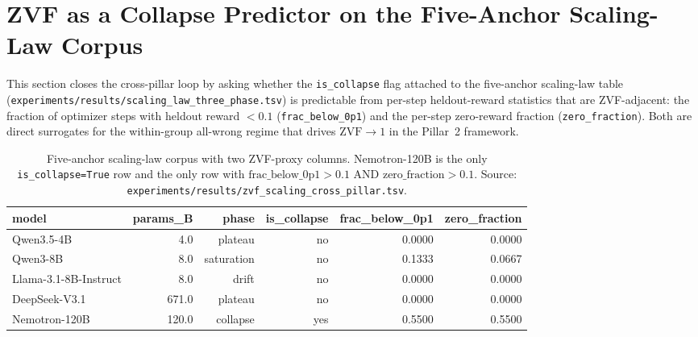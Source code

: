 %


\section{ZVF as a Collapse Predictor on the Five-Anchor Scaling-Law Corpus}
\label{sec:zvf-scaling}

This section closes the cross-pillar loop by asking whether the
\texttt{is\_collapse} flag attached to the five-anchor scaling-law
table (\texttt{experiments/results/scaling\_law\_three\_phase.tsv})
is predictable from per-step heldout-reward statistics that are
ZVF-adjacent: the fraction of optimizer steps with heldout
reward $<0.1$ (\texttt{frac\_below\_0p1}) and the per-step
zero-reward fraction (\texttt{zero\_fraction}). Both are direct
surrogates for the within-group all-wrong regime that drives
$\mathrm{ZVF} \to 1$ in the Pillar~2 framework.

\begin{table}[htbp]
\centering
\small
\begin{tabular}{lrrrrr}
\toprule
model & params\_B & phase & is\_collapse & frac\_below\_0p1 & zero\_fraction \\
\midrule
Qwen3.5-4B & 4.0 & plateau & no & 0.0000 & 0.0000 \\
Qwen3-8B & 8.0 & saturation & no & 0.1333 & 0.0667 \\
Llama-3.1-8B-Instruct & 8.0 & drift & no & 0.0000 & 0.0000 \\
DeepSeek-V3.1 & 671.0 & plateau & no & 0.0000 & 0.0000 \\
Nemotron-120B & 120.0 & collapse & yes & 0.5500 & 0.5500 \\
\bottomrule
\end{tabular}
\caption{Five-anchor scaling-law corpus with two ZVF-proxy columns. Nemotron-120B is the only \texttt{is\_collapse=True} row and the only row with $\text{frac\_below\_0p1} > 0.1$ AND $\text{zero\_fraction} > 0.1$. Source: \texttt{experiments/results/zvf\_scaling\_cross\_pillar.tsv}.}
\label{tab:zvf-scaling-anchors}
\end{table}

